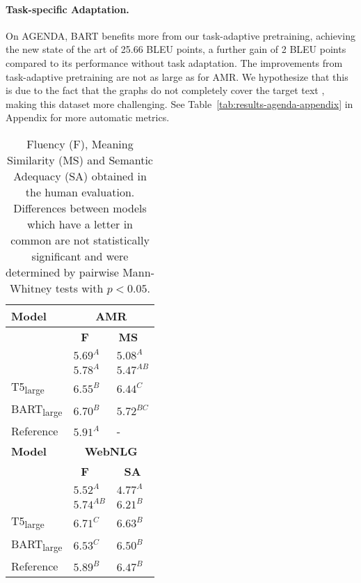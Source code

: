 \documentclass[11pt]{article}
\begin{document}
\paragraph{Task-specific Adaptation.} On AGENDA, BART benefits more from our task-adaptive pretraining, achieving the new state of the art of 25.66 BLEU points, a further gain of 2 BLEU points compared to its performance without task adaptation. The improvements from task-adaptive pretraining are not as large as for AMR. We hypothesize that this is due to the fact that the graphs do not completely cover the target text \cite{koncel-kedziorski-etal-2019-text}, making this dataset more challenging. See Table~\ref{tab:results-agenda-appendix} in Appendix for more automatic metrics. 



\begin{table}[t]
\centering
{\renewcommand{\arraystretch}{0.9}
\begin{tabular}{lll} 
\toprule
\textbf{Model} & \multicolumn{2}{c}{\textbf{AMR}}  \\
\midrule
& \, \,\textbf{F} & \,\textbf{MS} \\
\midrule
\citet{mager2020gpttoo} &${5.69}^{{\scriptscriptstyle A}}$&  ${5.08}^{{\scriptscriptstyle A}}$\\
\citet{harkous2020text} &${5.78}^{{\scriptscriptstyle A}}$&  ${5.47}^{{\scriptscriptstyle AB}}$\\
T5\textsubscript{large} &${6.55}^{{\scriptscriptstyle B}}$&  ${6.44}^{{\scriptscriptstyle C}}$\\
BART\textsubscript{large} &${6.70}^{{\scriptscriptstyle B}}$&  ${5.72}^{{\scriptscriptstyle BC}}$\\
Reference &${5.91}^{{\scriptscriptstyle A}}$& - \\
\midrule
\textbf{Model} & \multicolumn{2}{c}{\textbf{WebNLG}}  \\
 \midrule
& \, \,\textbf{F} & \, \,\textbf{SA} \\
\midrule
 \citet{castro-ferreira-etal-2019-neural} &${5.52}^{{\scriptscriptstyle A}}$& ${4.77}^{{\scriptscriptstyle A}}$ \\
 \citet{harkous2020text} &${5.74}^{{\scriptscriptstyle AB}}$&${6.21}^{{\scriptscriptstyle B}}$  \\
 T5\textsubscript{large} &${6.71}^{{\scriptscriptstyle C}}$&  ${6.63}^{{\scriptscriptstyle B}}$\\
BART\textsubscript{large} &${6.53}^{{\scriptscriptstyle C}}$& ${6.50}^{{\scriptscriptstyle B}}$ \\
Reference &${5.89}^{{\scriptscriptstyle B}}$& ${6.47}^{{\scriptscriptstyle B}}$ \\
\bottomrule
\end{tabular}}
\caption{Fluency (F), Meaning Similarity (MS) and Semantic Adequacy (SA) obtained in the human evaluation. Differences between models which have a letter in common are not statistically significant and were determined by pairwise Mann-Whitney tests with $p<0.05$.}
\label{tab:humanevevaluation}
\vspace{-0.3cm}
\end{table}
\end{document}
